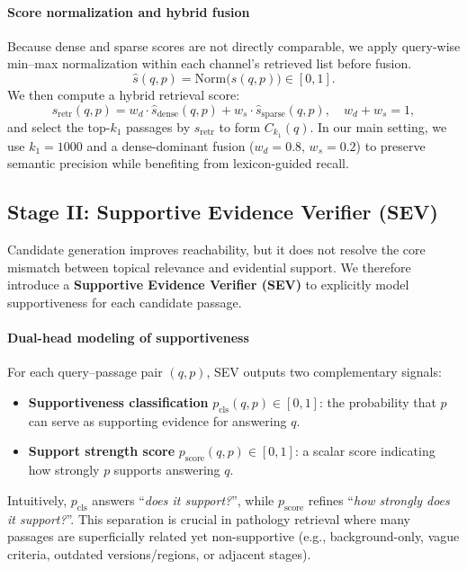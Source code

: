 \documentclass[preprint,12pt,a4paper]{elsarticle}
\begin{document}
\paragraph{Score normalization and hybrid fusion}
Because dense and sparse scores are not directly comparable, we apply query-wise min--max normalization within each channel's retrieved list before fusion.
\begin{equation}
\label{eq:norm}
\widehat{s}(q,p)=\mathrm{Norm}\big(s(q,p)\big)\in[0,1].
\end{equation}
We then compute a hybrid retrieval score:
\begin{equation}
\label{eq:hybrid}
s_{\text{retr}}(q,p)=w_d\cdot \widehat{s}_{\text{dense}}(q,p)+w_s\cdot \widehat{s}_{\text{sparse}}(q,p),
\quad w_d+w_s=1,
\end{equation}
and select the top-$k_1$ passages by $s_{\text{retr}}$ to form $C_{k_1}(q)$.
In our main setting, we use $k_1{=}1000$ and a dense-dominant fusion ($w_d{=}0.8,\,w_s{=}0.2$) to preserve semantic precision while benefiting from lexicon-guided recall.

\subsection{Stage II: Supportive Evidence Verifier (SEV)}
\label{sec:method:sev}
Candidate generation improves reachability, but it does not resolve the core mismatch between topical relevance and evidential support.
We therefore introduce a \textbf{Supportive Evidence Verifier (SEV)} to explicitly model supportiveness for each candidate passage.

\paragraph{Dual-head modeling of supportiveness}
For each query--passage pair $(q,p)$, SEV outputs two complementary signals:
\begin{itemize}
  \item \textbf{Supportiveness classification} $p_{\text{cls}}(q,p)\in[0,1]$:
  the probability that $p$ can serve as supporting evidence for answering $q$.
  \item \textbf{Support strength score} $p_{\text{score}}(q,p)\in[0,1]$:
  a scalar score indicating how strongly $p$ supports answering $q$.
\end{itemize}
Intuitively, $p_{\text{cls}}$ answers ``\emph{does it support?}'', while $p_{\text{score}}$ refines ``\emph{how strongly does it support?}''.
This separation is crucial in pathology retrieval where many passages are superficially related yet non-supportive (e.g., background-only, vague criteria, outdated versions/regions, or adjacent stages).
\end{document}
